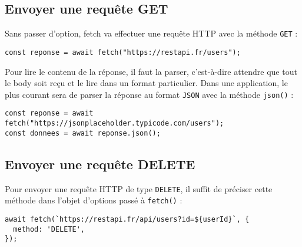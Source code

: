 \subsection{Envoyer une requête {\color{monOrange}GET}}
Sans passer d'option, {\color{monOrange}fetch} va effectuer une requête HTTP avec la méthode {\tt GET} :
\begin{verbatim}
const reponse = await fetch("https://restapi.fr/users");
\end{verbatim}
Pour lire le contenu de la réponse, il faut la parser, c'est-à-dire attendre que tout le body soit reçu et le lire dans un format particulier. Dans une application, le plus courant sera de parser la réponse au format {\tt JSON} avec la méthode {\tt json()} :
\begin{verbatim}
const reponse = await fetch("https://jsonplaceholder.typicode.com/users");
const donnees = await reponse.json();
\end{verbatim}
\subsection{Envoyer une requête DELETE}
Pour envoyer une requête HTTP de type {\tt DELETE}, il suffit de préciser cette méthode dans l'objet d'options passé à {\tt fetch()} :
\begin{verbatim}
await fetch(`https://restapi.fr/api/users?id=${userId}`, {
  method: 'DELETE',
});
\end{verbatim} 

